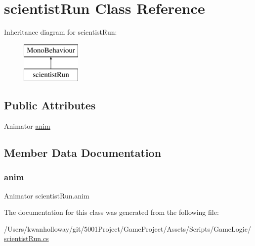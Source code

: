 \hypertarget{classscientist_run}{}\section{scientist\+Run Class Reference}
\label{classscientist_run}
Inheritance diagram for scientist\+Run\+:\begin{figure}[H]
\begin{center}
\leavevmode
\includegraphics[height=2.000000cm]{classscientist_run}
\end{center}
\end{figure}
\subsection*{Public Attributes}
\begin{DoxyCompactItemize}
\item 
Animator \hyperlink{classscientist_run_a9a991b6623ba188e3b670c0135d45176}{anim}
\end{DoxyCompactItemize}


\subsection{Member Data Documentation}
\mbox{\label{classscientist_run_a9a991b6623ba188e3b670c0135d45176}} 
\subsubsection{\texorpdfstring{anim}{anim}}
{\footnotesize\ttfamily Animator scientist\+Run.\+anim}



The documentation for this class was generated from the following file\+:\begin{DoxyCompactItemize}
\item 
/\+Users/kwanholloway/git/5001\+Project/\+Game\+Project/\+Assets/\+Scripts/\+Game\+Logic/\hyperlink{scientist_run_8cs}{scientist\+Run.\+cs}\end{DoxyCompactItemize}
